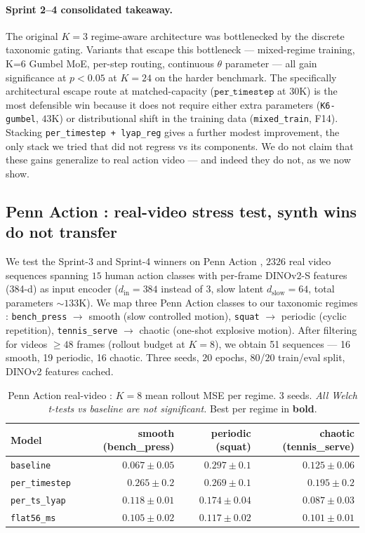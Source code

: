 \documentclass[11pt,a4paper]{article}
\begin{document}
\paragraph{Sprint 2--4 consolidated takeaway.}
The original $K{=}3$ regime-aware architecture was bottlenecked
by the discrete taxonomic gating. Variants that escape this
bottleneck --- mixed-regime training, K{=}6 Gumbel MoE, per-step
routing, continuous $\theta$ parameter --- all gain significance
at $p{<}0.05$ at $K{=}24$ on the harder benchmark. The
specifically architectural escape route at matched-capacity
($\texttt{per\_timestep}$ at $30$K) is the most defensible win
because it does not require either extra parameters
(\texttt{K6-gumbel}, $43$K) or distributional shift in the
training data (\texttt{mixed\_train}, F14). Stacking
\texttt{per\_timestep + lyap\_reg} gives a further modest
improvement, the only stack we tried that did not regress vs
its components. We do not claim that these gains generalize to
real action video --- and indeed they do not, as we now show.

\subsection{Penn Action : real-video stress test, synth wins do not transfer}
\label{sec:rwm-penn-action}

We test the Sprint-3 and Sprint-4 winners on Penn Action
\cite{zhang2013pennaction}, $2326$ real video sequences spanning
$15$ human action classes with per-frame DINOv2-S features
(384-d) as input encoder ($d_{\text{in}}{=}384$ instead of $3$,
slow latent $d_{\text{slow}}{=}64$, total parameters $\sim 133$K).
We map three Penn Action classes to our taxonomic regimes :
\texttt{bench\_press} $\to$ smooth (slow controlled motion),
\texttt{squat} $\to$ periodic (cyclic repetition),
\texttt{tennis\_serve} $\to$ chaotic (one-shot explosive motion).
After filtering for videos $\geq 48$ frames (rollout budget at
$K{=}8$), we obtain 51 sequences --- 16 smooth, 19 periodic, 16
chaotic. Three seeds, $20$ epochs, $80$/$20$ train/eval split,
DINOv2 features cached.

\begin{table}[h]
\centering
\caption{Penn Action real-video : $K{=}8$ mean rollout MSE per regime.
3 seeds. \emph{All Welch t-tests vs baseline are not significant.}
Best per regime in \textbf{bold}.}
\label{tab:penn-action}
\begin{tabular}{lrrr}
\toprule
Model & smooth (bench\_press) & periodic (squat) & chaotic (tennis\_serve) \\
\midrule
\texttt{baseline}     & $\bm{0.067 \pm 0.05}$ & $0.297 \pm 0.1$       & $0.125 \pm 0.06$ \\
\texttt{per\_timestep}& $0.265 \pm 0.2$       & $0.269 \pm 0.1$       & $0.195 \pm 0.2$ \\
\texttt{per\_ts\_lyap}& $0.118 \pm 0.01$      & $0.174 \pm 0.04$      & $\bm{0.087 \pm 0.03}$ \\
\texttt{flat56\_ms}   & $0.105 \pm 0.02$      & $\bm{0.117 \pm 0.02}$ & $0.101 \pm 0.01$ \\
\bottomrule
\end{tabular}
\end{table}
\end{document}
